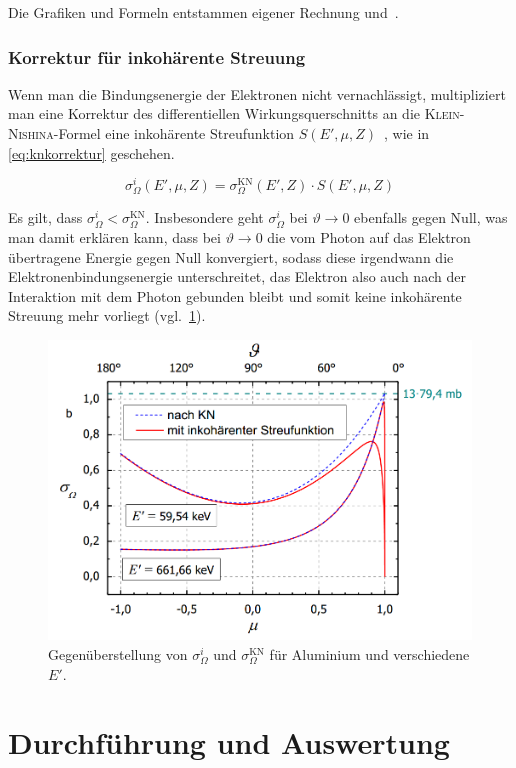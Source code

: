 \documentclass[slug=CS, room=Andreas-Schubert-Bau\,\ Labor\ 406,
supervisor=Juliane\ Volkmer, coursedate=29.\ 11.\ 2019]{../../Lab_Report_LaTeX/lab_report}
\begin{document}
Die Grafiken und Formeln entstammen eigener Rechnung und~\cite[3-5]{iktp19}.

\subsubsection{Korrektur für inkohärente Streuung}
\label{sec:cskorrektur}

Wenn man die Bindungsenergie der Elektronen nicht vernachlässigt,
multipliziert man eine Korrektur des differentiellen
Wirkungsquerschnitts an die \textsc{Klein}-\textsc{Nishina}-Formel
eine inkohärente Streufunktion \(S(E', \mu, Z)\)~\cite[5-6]{iktp19},
wie in \eqref{eq:knkorrektur} geschehen.

\begin{equation}\label{eq:knkorrektur}
        \sigma^{i}_\Omega(E', \mu, Z) = \sigma^{\text{KN}}_\Omega(E', Z) \cdot S(E', \mu, Z)
\end{equation}

Es gilt, dass \(\sigma^{i}_\Omega < \sigma^{\text{KN}}_\Omega\). Insbesondere geht
\(\sigma^{i}_\Omega\) bei \(\vartheta \rightarrow 0\) ebenfalls gegen Null, was man damit erklären
kann, dass bei \(\vartheta \rightarrow 0\) die vom Photon auf das Elektron übertragene Energie
gegen Null konvergiert, sodass diese irgendwann die Elektronenbindungsenergie unterschreitet,
das Elektron also auch nach der Interaktion mit dem Photon gebunden bleibt und somit keine
inkohärente Streuung mehr vorliegt (vgl.~\ref{fig:sigmaknkorrigiert}).

\begin{figure}[H]\centering
        \includegraphics[width=.5\columnwidth]{./pictures/sigma_kn_korrigiert.png}
        \caption{Gegenüberstellung von \(\sigma^{i}_\Omega\) und \(\sigma^{\text{KN}}_\Omega\) für
        Aluminium und verschiedene \(E'\).}
        \label{fig:sigmaknkorrigiert}
\end{figure}

\section{Durchführung und Auswertung}
\label{sec:experiment}
\end{document}
